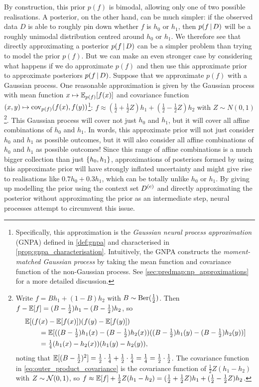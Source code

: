 \documentclass[12pt, twoside]{report}
\begin{document}
By construction, this prior $p(f)$ is bimodal, allowing only one of two possible realisations.
A posterior, on the other hand, can be much simpler: if the observed data $D$ is able to roughly pin down whether $f$ is $h_0$ or $h_1$, then $p(f \cond D)$ will be a roughly unimodal distribution centred around $h_0$ or $h_1$.
We therefore see that directly approximating a posterior $p(f \cond D)$ can be a simpler problem than trying to model the prior $p(f)$.
But we can make an even stronger case by considering what happens if we do approximate $p(f)$ and then use this approximate prior to approximate posteriors $p(f \cond D)$.
Suppose that we approximate $p(f)$ with a Gaussian process.
One reasonable approximation is given by the Gaussian process with mean function $x \mapsto \E_{p(f)}[f(x)]$ and covariance function $(x, y) \mapsto \cov_{p(f)}(f(x), f(y))$\footnote{
    Specifically, this approximation is the \emph{Gaussian neural process approximation} (GNPA) defined in \cref{def:gnpa} and characterised in \cref{prop:gnpa_characterisation}.
    Intuitively, the GNPA constructs the \emph{moment-matched Gaussian process} by taking the mean function and covariance function of the non-Gaussian process.
    See \cref{sec:predmap:np_approximations} for a more detailed discussion.
}:
$f \approx (\tfrac12 + \tfrac12 Z)h_1 + (\tfrac12 - \tfrac12 Z) h_2$ with $Z \sim N(0, 1)$\footnote{
    Write $f = B h_1 + (1 - B) h_2$ with $B \sim \Ber(\tfrac12)$.
    Then $f - \E[f] = (B - \tfrac12) h_1 - (B - \tfrac12) h_2$, so%
    \begin{align}
        &\E[(f(x) - \E[f(x)])(f(y) - \E[f(y)]) \nonumber \\
        &\qquad= \E[
            ((B - \tfrac12) h_1(x) - (B - \tfrac12) h_2(x))
            ((B - \tfrac12) h_1(y) - (B - \tfrac12) h_2(y))
        ] \\
        &\qquad = \label{eq:outer_product_covariance}
            \tfrac14 (h_1(x) - h_2(x))
            (h_1(y) - h_2(y)), 
    \end{align}
    noting that $\E[(B - \frac12)^2] = \tfrac12 \cdot\tfrac14 + \tfrac12 \cdot \tfrac14 =\tfrac14 = \tfrac12\cdot\tfrac12$.
    The covariance function in \eqref{eq:outer_product_covariance} is the covariance function of $\tfrac12 Z(h_1 - h_2)$ with $Z \sim \Normal(0, 1)$,
    so $f \approx \E[f] + \tfrac12 Z(h_1 - h_2) = (\tfrac12 + \tfrac12 Z) h_1 + (\tfrac12 - \tfrac12 Z) h_2$.
}.
This Gaussian process will cover not just $h_0$ and $h_1$, but it will cover all affine combinations of $h_0$ and $h_1$.
In words, this approximate prior will not just consider $h_0$ and $h_1$ as possible outcomes, but it will also consider all affine combinations of $h_0$ and $h_1$ as possible outcomes!
Since this range of affine combinations is a much bigger collection than just $\set{h_0, h_1}$, approximations of posteriors formed by using this approximate prior will have strongly inflated uncertainty and might give rise to realisations like $0.7 h_0 + 0.3 h_1$, which can be totally unlike $h_0$ or $h_1$.
By giving up modelling the prior using the context set $D\us{(c)}$ and directly approximating the posterior without approximating the prior as an intermediate step, neural processes attempt to circumvent this issue.
\end{document}

